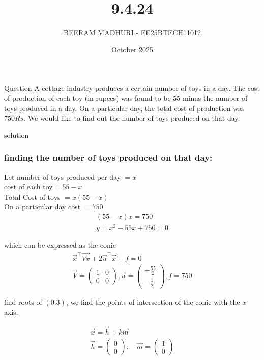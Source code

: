 \documentclass{beamer}
\title %
{9.4.24}
\date{October  2025}
\author %
{BEERAM MADHURI - EE25BTECH11012}
\begin{document}
\frame{\titlepage}
\begin{frame}{Question}
A cottage industry produces a certain number of toys in a day. The cost of production of each toy (in rupees) was found to be $55$ minus the number of toys produced in a day. On a particular day, the total cost of production was $750Rs$. We would like to find out the number of toys produced on that day.
\end{frame}
 
\begin{frame}{solution}
    \frametitle{finding the number of toys produced on that day:}
Let number of toys produced per day $= x$ \\
cost of each toy$= 55-x$ \\
Total Cost of toys $= x(55-x)$ \\

On a particular day cost $= 750$ 
\begin{align}
(55-x) x = 750 \\
y=x^2 - 55x + 750 = 0
\end{align}
\end{frame}
\begin{frame}
which can be expressed as the conic
\begin{align}
\vec{x}^\top \vec{V x} + 2 \vec{u}^\top \vec{x} + f = 0\\
\vec{V} = \begin{pmatrix} 1 & 0 \\ 0 & 0 \end{pmatrix}, \vec{u} = \begin{pmatrix} -\frac{55}{2} \\ -\frac{1}{2} \end{pmatrix}, f = 750
\end{align}

find roots of $(0.3)$, we find the points of intersection of the conic with the $x$-axis.

\begin{align}
\vec{x} = \vec{h} + k\vec{m}\\
\vec{h} = \begin{pmatrix} 0 \\ 0 \end{pmatrix}, \quad \vec{m} = \begin{pmatrix} 1 \\ 0 \end{pmatrix}
\end{align}
\end{frame}
\end{document}
